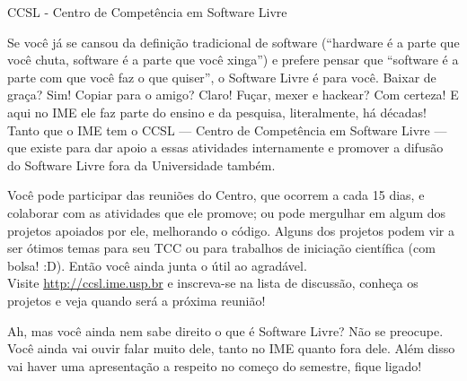\begin{secao}{CCSL - Centro de Competência em Software Livre}

Se você já se cansou da definição tradicional de software (``hardware é a parte
que você chuta, software é a parte que você xinga'') e prefere pensar que
``software é a parte com que você faz o que quiser'', o Software Livre é para você. 
Baixar de graça? Sim! Copiar para o amigo? Claro! Fuçar, mexer e hackear? Com
 certeza! E aqui no IME ele faz parte do ensino e da pesquisa, literalmente, há
 décadas! Tanto que o IME tem o CCSL --- Centro de Competência em Software Livre
 --- que existe para dar apoio a essas atividades internamente e promover a
 difusão do Software Livre fora da Universidade também.

Você pode participar das reuniões do Centro, que ocorrem a cada 15 dias, e
 colaborar com as atividades que ele promove; ou pode mergulhar em algum dos
 projetos apoiados por ele, melhorando o código. Alguns dos projetos podem vir a
 ser ótimos temas para seu TCC ou para trabalhos de iniciação científica (com
 bolsa! :D). Então você ainda junta o útil ao agradável.\\
Visite \url{http://ccsl.ime.usp.br} e inscreva-se na lista de discussão,
 conheça os projetos e veja quando será a próxima reunião!

Ah, mas você ainda nem sabe direito o que é Software Livre? Não se preocupe.
Você ainda vai ouvir falar muito dele, tanto no IME quanto fora dele. Além
disso vai haver uma apresentação a respeito no começo do semestre, fique ligado! %

\end{secao}
